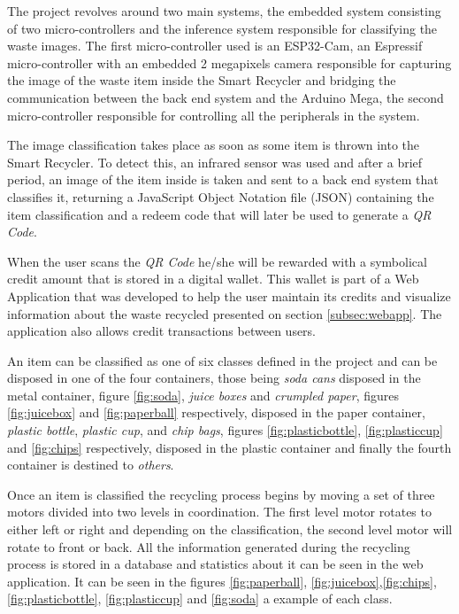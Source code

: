 \documentclass[a4paper,11pt]{article}
\begin{document}
The project revolves around two main systems, the embedded system consisting of two micro-controllers and the inference system responsible for classifying the waste images. The first micro-controller used is an ESP32-Cam, an Espressif micro-controller with an embedded 2 megapixels camera responsible for capturing the image of the waste item inside the Smart Recycler and bridging the communication between the back end system and the Arduino Mega, the second micro-controller responsible for controlling all the peripherals in the system.

The image classification takes place as soon as some item is thrown into the Smart Recycler. To detect this, an infrared sensor was used and after a brief period, an image of the item inside is taken and sent to a back end system that classifies it, returning a JavaScript Object Notation file (JSON) containing the item classification and a redeem code that will later be used to generate a \textit{QR Code}.

When the user scans the \textit{QR Code} he/she will be rewarded with a symbolical credit amount that is stored in a digital wallet. This wallet is part of a Web Application that was developed to help the user maintain its credits and visualize information about the waste recycled presented on section \ref{subsec:webapp}. The application also allows credit transactions between users.

An item can be classified as one of six classes defined in the project and can be disposed in one of the four containers, those being \textit{soda cans} disposed in the metal container, figure \ref{fig:soda}, \textit{juice boxes} and \textit{crumpled paper}, figures \ref{fig:juicebox} and \ref{fig:paperball} respectively, disposed in the paper container, \textit{plastic bottle}, \textit{plastic cup}, and \textit{chip bags}, figures \ref{fig:plasticbottle}, \ref{fig:plasticcup} and \ref{fig:chips} respectively, disposed in the plastic container and finally the fourth container is destined to \textit{others}.

Once an item is classified the recycling process begins by moving a set of three motors divided into two levels in coordination. The first level motor rotates to either left or right and depending on the classification, the second level motor will rotate to front or back. All the information generated during the recycling process is stored in a database and statistics about it can be seen in the web application. It can be seen in the figures \ref{fig:paperball}, \ref{fig:juicebox},\ref{fig:chips}, \ref{fig:plasticbottle}, \ref{fig:plasticcup} and \ref{fig:soda} a example of each class.
\end{document}
